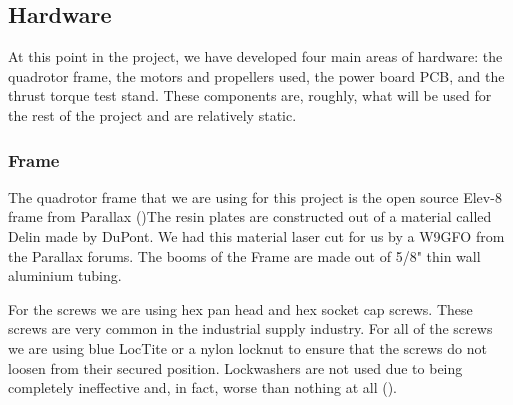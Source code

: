 \documentclass{article}
\numberwithin{equation}{section} %
\begin{document}

\subsection{Hardware}
At this point in the project, we have developed four main areas of hardware: the quadrotor frame, the motors and propellers used, the power board PCB, and the thrust torque test stand. These components are, roughly, what will be used for the rest of the project and are relatively static. 

\subsubsection{Frame}
The quadrotor frame that we are using for this project is the open source Elev-8 frame from Parallax (\cite{elev8_frame})The resin plates are constructed out of a material called Delin\textregistered\cite{dupontdelin} made by DuPont\texttrademark. We had this material laser cut for us by a W9GFO from the Parallax forums. The booms of the Frame are made out of 5/8" thin wall aluminium tubing.

For the screws we are using hex pan head and hex socket cap screws. These screws are very common in the industrial supply industry. For all of the screws we are using blue LocTite or a nylon locknut to ensure that the screws do not loosen from their secured position. Lockwashers are not used due to being completely ineffective and, in fact, worse than nothing at all (\cite{vibration_loose}).
\end{document}

